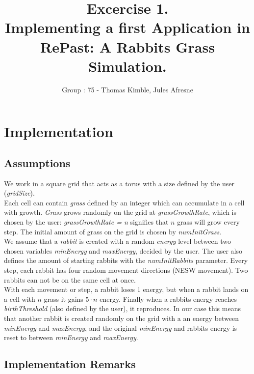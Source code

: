 \documentclass[11pt]{article}
\title{\bf Excercise 1.\\ Implementing a first Application in RePast: A Rabbits Grass Simulation.}
\author{Group \textnumero: 75 - Thomas Kimble, Jules Afresne}
\begin{document}
\maketitle

\section{Implementation}

\subsection{Assumptions}

We work in a square grid that acts as a torus with a size defined by the user (\textit{gridSize}). \\
\indent Each cell can contain \textit{grass} defined by an integer which can accumulate in a cell with growth. \textit{Grass} grows randomly on the grid at \textit{grassGrowthRate}, which is chosen by the user: \textit{grassGrowthRate = n} signifies that $n$ grass will grow every step. The initial amount of grass on the grid is chosen by \textit{numInitGrass}.\\
\indent We assume that a \textit{rabbit} is created with a random \textit{energy} level between two chosen variables \textit{minEnergy} and \textit{maxEnergy}, decided by the user. The user also defines the amount of starting rabbits with the \textit{numInitRabbits} parameter. Every step, each rabbit has four random movement directions (NESW movement). Two rabbits can not be on the same cell at once. \\
\indent With each movement or step, a rabbit loses $1$ energy, but when a rabbit lands on a cell with $n$ grass it gains $5\cdot n$ energy. Finally when a rabbits energy reaches \textit{birthThreshold} (also defined by the user), it reproduces. In our case this means that another rabbit is created randomly on the grid with a an energy between \textit{minEnergy} and \textit{maxEnergy}, and the original \textit{minEnergy} and rabbits energy is reset to between \textit{minEnergy} and \textit{maxEnergy}.

\subsection{Implementation Remarks}
\end{document}
